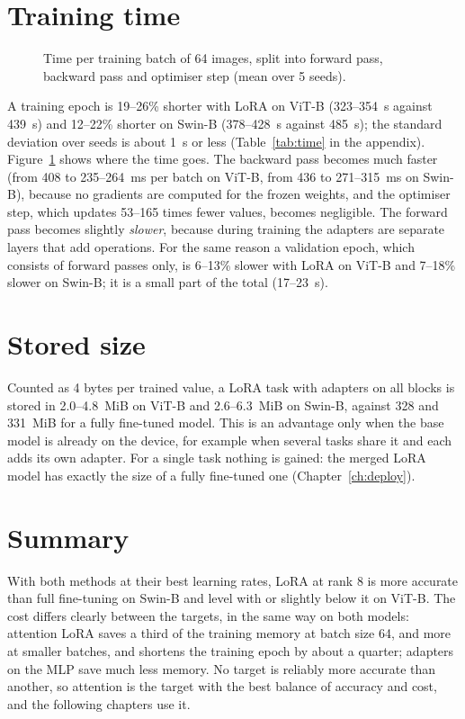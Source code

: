 \section{Training time}
\label{sec:time}

\begin{figure}[!htb]
\centering

\caption{Time per training batch of 64 images, split into forward pass, backward pass and optimiser step (mean
over 5 seeds).}
\label{fig:time_batch}
\end{figure}

A training epoch is 19--26\% shorter with LoRA on ViT-B (323--354~s against 439~s) and 12--22\% shorter on Swin-B
(378--428~s against 485~s); the standard deviation over seeds is about 1~s or less (Table~\ref{tab:time} in the
appendix).
Figure~\ref{fig:time_batch} shows where the time goes. The backward pass becomes much faster (from 408 to
235--264~ms per batch on ViT-B, from 436 to 271--315~ms on Swin-B), because no gradients are computed for the frozen
weights, and the optimiser step, which updates 53--165 times fewer values, becomes negligible. The forward pass
becomes slightly \emph{slower}, because during training the adapters are separate layers that add operations. For
the same reason a validation epoch, which consists of forward passes only, is 6--13\% slower with LoRA on ViT-B and
7--18\% slower on Swin-B; it is a small part of the total (17--23~s).

\section{Stored size}
\label{sec:size}

Counted as 4 bytes per trained value, a LoRA task with adapters on all blocks is stored in 2.0--4.8~MiB on ViT-B and 2.6--6.3~MiB on Swin-B,
against 328 and 331~MiB for a fully fine-tuned model. This is an advantage only when the base model is already on
the device, for example when several tasks share it and each adds its own adapter. For a single task nothing is
gained: the merged LoRA model has exactly the size of a fully fine-tuned one (Chapter~\ref{ch:deploy}).

\section{Summary}

With both methods at their best learning rates, LoRA at rank 8 is more accurate than full fine-tuning on Swin-B and
level with or slightly below it on ViT-B. The cost differs clearly between the targets, in the same way on both models: attention LoRA
saves a third of the training memory at batch size 64, and more at smaller batches, and shortens the training epoch
by about a quarter; adapters on the MLP save much less memory. No target is reliably more accurate than another, so
attention is the target with the best balance of accuracy and cost, and the following chapters use it.
